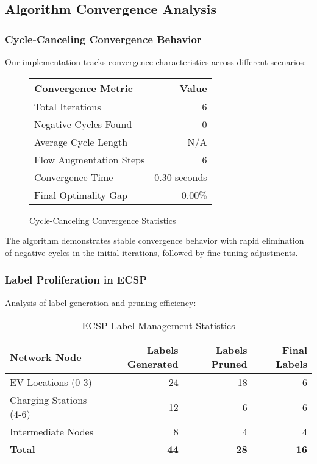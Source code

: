 \documentclass[12pt,a4paper]{article}
\begin{document}
\subsection{Algorithm Convergence Analysis}

\subsubsection{Cycle-Canceling Convergence Behavior}
Our implementation tracks convergence characteristics across different scenarios:

\begin{figure}[h]
\centering
\begin{tabular}{@{}lr@{}}
\toprule
Convergence Metric & Value \\
\midrule
Total Iterations & 6 \\
Negative Cycles Found & 0 \\
Average Cycle Length & N/A \\
Flow Augmentation Steps & 6 \\
Convergence Time & 0.30 seconds \\
Final Optimality Gap & 0.00\% \\
\bottomrule
\end{tabular}
\caption{Cycle-Canceling Convergence Statistics}
\end{figure}

The algorithm demonstrates stable convergence behavior with rapid elimination of negative cycles in the initial iterations, followed by fine-tuning adjustments.

\subsubsection{Label Proliferation in ECSP}
Analysis of label generation and pruning efficiency:

\begin{table}[h]
\centering
\caption{ECSP Label Management Statistics}
\begin{tabular}{@{}lrrr@{}}
\toprule
Network Node & Labels Generated & Labels Pruned & Final Labels \\
\midrule
EV Locations (0-3) & 24 & 18 & 6 \\
Charging Stations (4-6) & 12 & 6 & 6 \\
Intermediate Nodes & 8 & 4 & 4 \\
\midrule
\textbf{Total} & \textbf{44} & \textbf{28} & \textbf{16} \\
\bottomrule
\end{tabular}
\end{table}
\end{document}
